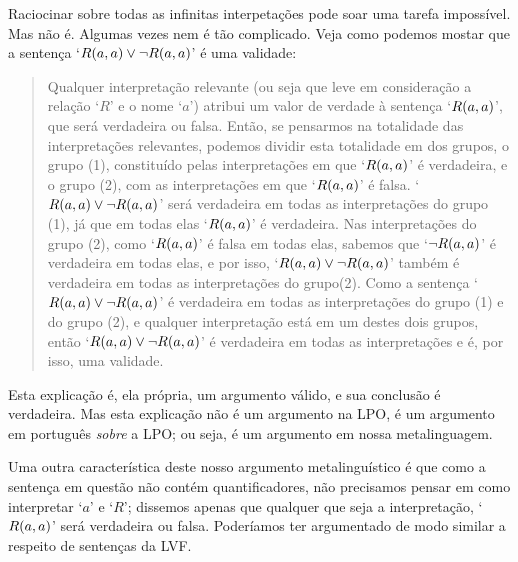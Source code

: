 Raciocinar sobre todas as infinitas interpetações pode soar uma tarefa impossível.
Mas não é.
Algumas vezes nem  é tão complicado.
Veja como podemos mostar que a sentença \mbox{`$\mathord{R}(a,a)\vee\neg \mathord{R}(a,a)$'} é uma validade:
	\begin{quote}
		\label{allmodels1}
		Qualquer interpretação relevante (ou seja que leve em consideração a relação `$R$' e o nome `$a$') atribui um valor de verdade à sentença `$\mathord{R}(a,a)$', que será verdadeira ou falsa.
		Então, se pensarmos na totalidade das interpretações relevantes, podemos dividir esta totalidade em dos grupos, o grupo (1), constituído pelas interpretações em que `$\mathord{R}(a,a)$' é verdadeira, e o grupo (2), com as interpretações em que  `$\mathord{R}(a,a)$' é falsa.
		`$\mathord{R}(a,a)\vee\neg \mathord{R}(a,a)$' será verdadeira em todas as interpretações do grupo (1), já que em todas elas `$\mathord{R}(a,a)$' é verdadeira.
		Nas interpretações do grupo (2), como  `$\mathord{R}(a,a)$' é falsa em todas elas, sabemos que `$\neg \mathord{R}(a,a)$' é verdadeira em todas elas, e por isso, `$\mathord{R}(a,a)\vee\neg \mathord{R}(a,a)$' também é verdadeira em todas as interpretações do grupo(2).
		Como a sentença `$\mathord{R}(a,a)\vee\neg \mathord{R}(a,a)$' é verdadeira em todas as interpretações do grupo (1) e do grupo (2), e qualquer interpretação está em um destes dois grupos, então `$\mathord{R}(a,a)\vee\neg \mathord{R}(a,a)$' é verdadeira em todas as interpretações e é, por isso, uma validade.
	\end{quote}
Esta explicação é, ela própria, um argumento válido, e sua conclusão é verdadeira. Mas esta explicação não é um argumento na LPO, é um argumento em português \emph{sobre} a LPO; ou seja, é um argumento em nossa metalinguagem.

Uma outra característica deste nosso argumento metalinguístico é que como a sentença em questão não contém quantificadores, não precisamos pensar em como interpretar `$a$' e `$R$'; dissemos apenas que qualquer que seja a interpretação,  `$\mathord{R}(a,a)$' será verdadeira ou falsa.
Poderíamos ter argumentado de modo similar a respeito de sentenças da LVF.

